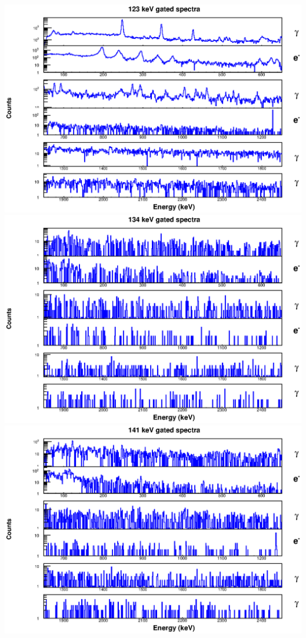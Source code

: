 \includegraphics[scale=0.8]{154Gd_Appendix/123_combined.eps}
\includegraphics[scale=0.8]{154Gd_Appendix/134_combined.eps}
\includegraphics[scale=0.8]{154Gd_Appendix/141_combined.eps}
